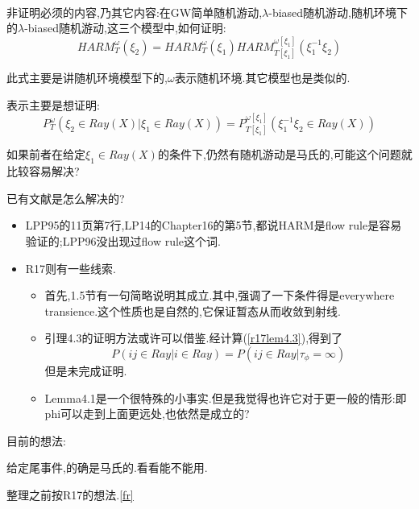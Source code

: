 					\begin{que}
						\label{origin flow rule}
						\ 

						非证明必须的内容,乃其它内容:在GW简单随机游动,$\lambda$-biased随机游动,随机环境下的$\lambda$-biased随机游动,这三个模型中,如何证明:
						$$HARM^\omega_T(\xi_2) = HARM^\omega_T(\xi_1)HARM^{\omega[\xi_1]}_{T[\xi_1]}(\xi_1^{-1}\xi_2)$$

						此式主要是讲随机环境模型下的,$\omega$表示随机环境.其它模型也是类似的.

						表示主要是想证明:
						$$P^\omega_T( \xi_2 \in Ray(X) | \xi_1 \in Ray(X) ) = P^{\omega[\xi_1]}_{T[\xi_1]}( \xi_1^{-1}\xi_2 \in Ray(X) )$$

						如果前者在给定${\xi_1 \in Ray(X)}$的条件下,仍然有随机游动是马氏的,可能这个问题就比较容易解决?

						\qquad 已有文献是怎么解决的?


						\begin{itemize}
							
							\item LPP95的11页第7行,LP14的Chapter16的第5节,都说HARM是flow rule是容易验证的;LPP96没出现过flow rule这个词.

							\item R17则有一些线索.

								\begin{itemize}
							
									\item 首先,1.5节有一句简略说明其成立.其中,强调了一下条件得是everywhere transience.这个性质也是自然的,它保证暂态从而收敛到射线.

									\item 引理4.3的证明方法或许可以借鉴.经计算(\ref{r17lem4.3}),得到了
									$$P(ij\in Ray | i \in Ray) = P(ij\in Ray | \tau_\phi = \infty)$$
									但是未完成证明.

									\item Lemma4.1是一个很特殊的小事实.但是我觉得也许它对于更一般的情形:即phi可以走到上面更远处,也依然是成立的?

								\end{itemize}

						\end{itemize}
							

						\qquad 目前的想法:

							给定尾事件,的确是马氏的.看看能不能用.

							整理之前按R17的想法.\ref{fr}


\end{que}
